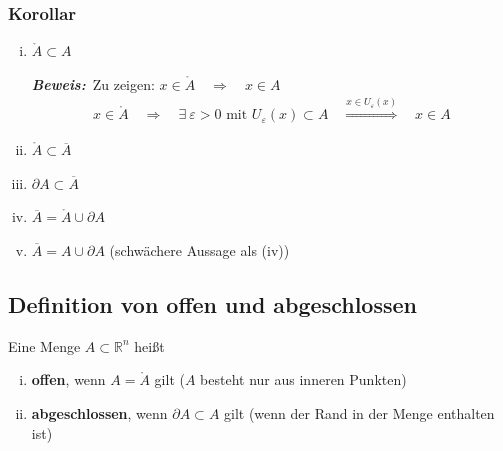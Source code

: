 \documentclass[11pt,a4paper]{book}
\newcommand {\Rn}	{\mathbb{R}^n}
\newcommand{\1}    	{\mathbbm{1}}
\newcommand{\mitt}	{\textrm{ mit }}
\newcommand{\Beweis}[1][Beweis]
{\begin{mdframed}[backgroundcolor=gray!10,linewidth=0pt]\noindent\textit{\textbf{{#1}:}}~}
\newcommand{\QED}	{\end{mdframed}}
\begin{document}
\subsubsection*{Korollar}
\begin{enumerate}[(i)]
	\item \(\mathring{A} \subset A\)
	\Beweis Zu zeigen: \(x \in \mathring{A} \quad\Rightarrow\quad x \in A\)
	\begin{align*}
		x \in \mathring{A} \quad\Rightarrow\quad
		\exists~ \varepsilon > 0 \mitt U_\varepsilon(x) \subset A
		\quad\stackrel{x \in U_\varepsilon(x)}{\Rightarrow}\quad x \in A
	\end{align*}\QED
	\item \(\mathring{A} \subset \overline{A}\)
	\item \(\partial A \subset \overline{A}\)
	\item \(\overline{A} = \mathring{A} \cup \partial A \)
	\item \(\overline{A} = A \cup \partial A \) (schwächere Aussage als (iv))
\end{enumerate}

\subsection{Definition von offen und abgeschlossen}
\label{sec:def_offen_abgeschl}
Eine Menge \(A \subset \Rn\) heißt
\begin{enumerate}[(i)]
	\item \textbf{offen}, wenn \(A = \mathring{A} \) gilt (\(A\) besteht nur aus inneren Punkten)
	\item \textbf{abgeschlossen}, wenn \(\partial A \subset A \) gilt (wenn der Rand in der Menge enthalten ist)
\end{enumerate}
\end{document}
